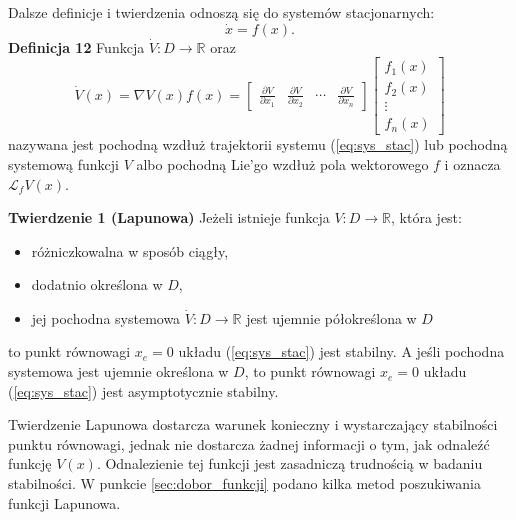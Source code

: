 \documentclass{article}
\begin{document}
Dalsze definicje i twierdzenia odnoszą się do systemów stacjonarnych:
\begin{equation}\label{eq:sys_stac}
    \dot{x} = f(x).
\end{equation}
\textbf{Definicja 12}
Funkcja $\dot{V}: D \rightarrow \mathbb{R}$ oraz 
$$
    \dot{V}(x)=\nabla V(x)f(x) = \begin{bmatrix} \frac{\partial V}{\partial x_{1}} & \frac{\partial V}{\partial x_{2}} & \cdots & \frac{\partial V}{\partial x_{n}} \end{bmatrix}
    \begin{bmatrix} f_{1}(x) \\ f_{2}(x) \\ \vdots \\ f_{n}(x) \end{bmatrix}
$$
nazywana jest pochodną wzdłuż trajektorii systemu (\ref{eq:sys_stac}) lub pochodną systemową funkcji $V$ albo pochodną Lie'go wzdłuż pola wektorowego $f$ i oznacza $\mathcal{L}_{f}V(x)$.

\textbf{Twierdzenie 1 (Lapunowa)}
Jeżeli istnieje funkcja $V: D \rightarrow \mathbb{R}$, która jest:
\begin{itemize}
    \item różniczkowalna w sposób ciągły,
    \item dodatnio określona w $D$,
    \item jej pochodna systemowa $\dot{V}:D\rightarrow \mathbb{R}$ jest ujemnie półokreślona w $D$
\end{itemize}
to punkt równowagi $x_{e} = 0$ układu (\ref{eq:sys_stac}) jest stabilny.
A jeśli pochodna systemowa jest ujemnie określona w $D$, to punkt równowagi $x_{e} = 0$ układu (\ref{eq:sys_stac}) jest asymptotycznie stabilny.

\begin{tcolorbox}[colback=blue!5, colframe=blue!75!black, title=Ważne]
Twierdzenie Lapunowa dostarcza warunek konieczny i wystarczający stabilności punktu równowagi, jednak nie dostarcza żadnej informacji o tym, jak odnaleźć funkcję $V(x)$. Odnalezienie tej funkcji jest zasadniczą trudnością w badaniu stabilności.
W punkcie \ref{sec:dobor_funkcji} podano kilka metod poszukiwania funkcji Lapunowa.
\end{tcolorbox}
\end{document}
